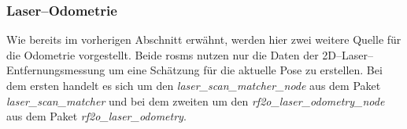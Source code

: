 \begin{comment}
--------------------------------------------------------------------------------
- \url{http://wiki.ros.org/rf2o}
- \url{http://wiki.ros.org/laser_scan_matcher}

rf2o\_laser\_odometry
Estimation of 2D odometry based on planar laser scans. Useful for mobile robots with innacurate base odometry. For full description of the algorithm, please refer to: Planar Odometry from a Radial Laser Scanner. A Range Flow-based Approach. ICRA 2016 Available at: http://mapir.isa.uma.es/mapirwebsite/index.php/mapir-downloads/papers/217


laser\_scan\_matcher
An incremental laser scan matcher, using Andrea Censi's Canonical Scan Matcher (CSM) implementation. See the web site for more about CSM. NOTE the CSM library is licensed under the GNU Lesser General Public License v3, whereas the rest of the code is released under the BSD license.

The laser_scan_matcher package is an incremental laser scan registration tool. The package allows to scan match between consecutive sensor_msgs/LaserScan messages, and publish the estimated position of the laser as a geometry_msgs/Pose2D or a tf transform.

The package can be used without any odometry estimation provided by other sensors. Thus, it can serve as a stand-alone odometry estimator. Alternatively, you can provide several types of odometry input to improve the registration speed and accuracy.

    <node
        if="$(arg enable_laser_scan_matcher)"
        pkg="laser_scan_matcher" type="laser_scan_matcher_node" name="laser_scan_matcher_node"
        output="screen">

        <param name="base_frame" value="base_link"/>
        <param name="fixed_frame" value="odom" />
        <param name="use_odom" value="true" />
        <param name="use_imu" value="false" />
    </node>

- Vergleichen der Roboter--Odometrie mit zwei Laser--Odometrien.

\end{comment}
\subsubsection{Laser--Odometrie}

Wie bereits im vorherigen Abschnitt erwähnt, werden hier zwei weitere Quelle für die Odometrie vorgestellt. Beide \Glspl{rosm} nutzen nur die Daten der 2D--Laser--Ent\-fern\-ungs\-mes\-sung um eine Schätzung für die aktuelle Pose zu erstellen. Bei dem ersten handelt es sich um den \textit{laser\_scan\_matcher\_node} aus dem Paket \textit{laser\_scan\_matcher} und bei dem zweiten um den \textit{rf2o\_laser\_odometry\_node} aus dem Paket \textit{rf2o\_laser\_odometry}.


